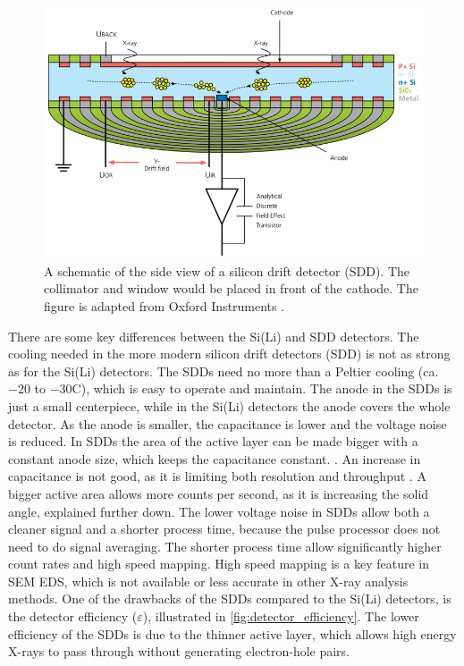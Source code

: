 \begin{figure}[pht]
    \centering
    \includegraphics[width=0.89\linewidth]{figures/EDS_SDD.png}
    \caption{
        A schematic of the side view of a silicon drift detector (SDD).
        The collimator and window would be placed in front of the cathode.
        The figure is adapted from Oxford Instruments \cite{oxford_sdd_explained}.
    }
    \label{fig:eds_sdd}
\end{figure}



There are some key differences between the Si(Li) and SDD detectors. 
The cooling needed in the more modern silicon drift detectors (SDD) is not as strong as for the Si(Li) detectors. 
The SDDs need no more than a Peltier cooling (ca.$ -20 $ to $-30$\textdegree C), which is easy to operate and maintain.
The anode in the SDDs is just a small centerpiece, while in the Si(Li) detectors the anode covers the whole detector.
As the anode is smaller, the capacitance is lower and the voltage noise is reduced.
In SDDs the area of the active layer can be made bigger with a constant anode size, which keeps the capacitance constant. \cite{notaros_electromagnetics_2010}.
An increase in capacitance is not good, as it is limiting both resolution and throughput \cite[Ch. 16.3.9]{goldstein_scanning_2018}.
A bigger active area allows more counts per second, as it is increasing the solid angle, explained further down.
The lower voltage noise in SDDs allow both a cleaner signal and a shorter process time, because the pulse processor does not need to do signal averaging.
The shorter process time allow significantly higher count rates and high speed mapping.
High speed mapping is a key feature in SEM EDS, which is not available or less accurate in other X-ray analysis methods.
One of the drawbacks of the SDDs compared to the Si(Li) detectors, is the detector efficiency ($\varepsilon$), illustrated in \cref{fig:detector_efficiency}.
The lower efficiency of the SDDs is due to the thinner active layer, which allows high energy X-rays to pass through without generating electron-hole pairs.


